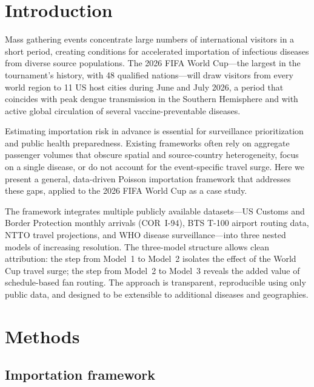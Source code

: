 \documentclass[12pt]{article}
\begin{document}
\section*{Introduction}

Mass gathering events concentrate large numbers of international
visitors in a short period, creating conditions for accelerated
importation of infectious diseases from diverse source populations.
The 2026 FIFA World Cup---the largest in the tournament's history,
with 48 qualified nations---will draw visitors from every world
region to 11 US host cities during June and July 2026, a period
that coincides with peak dengue transmission in the Southern
Hemisphere and with active global circulation of several
vaccine-preventable diseases.

Estimating importation risk in advance is essential for surveillance
prioritization and public health preparedness. Existing frameworks
often rely on aggregate passenger volumes that obscure spatial and
source-country heterogeneity, focus on a single disease, or do not
account for the event-specific travel surge. Here we present a
general, data-driven Poisson importation framework that addresses
these gaps, applied to the 2026 FIFA World Cup as a case study.

The framework integrates multiple publicly available datasets---US
Customs and Border Protection monthly arrivals (COR~I-94), BTS T-100
airport routing data, NTTO travel projections, and WHO disease
surveillance---into three nested models of increasing resolution. The
three-model structure allows clean attribution: the step from Model~1
to Model~2 isolates the effect of the World Cup travel surge; the
step from Model~2 to Model~3 reveals the added value of
schedule-based fan routing. The approach is transparent, reproducible
using only public data, and designed to be extensible to additional
diseases and geographies.

\section*{Methods}

\subsection*{Importation framework}
\end{document}
